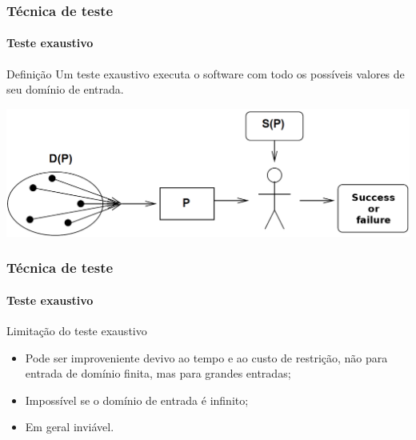 \begin{frame}
\frametitle{Técnica de teste}
\framesubtitle{Teste exaustivo}
\label{concept:exhaustive-testing}

\begin{block:concept}{Definição}
Um teste exaustivo executa o software com todo os possíveis valores de seu domínio de entrada.
\end{block:concept}

\begin{block:fact}{}
    \centering
    \includegraphics[width=\textwidth]{teste-de-software/conceitos-basicos/Imagens/exhaustive-software-testing}
\end{block:fact}

\hfill
{}
\end{frame}



\begin{frame}
\frametitle{Técnica de teste}
\framesubtitle{Teste exaustivo}

\begin{block:fact}{Limitação do teste exaustivo}
\begin{itemize}
	\item Pode ser improveniente devivo ao tempo e ao custo de restrição, não para entrada de domínio finita, mas para grandes entradas;

	\item Impossível se o domínio de entrada é infinito;

	\item Em geral inviável.
\end{itemize}
\end{block:fact}
\end{frame}



